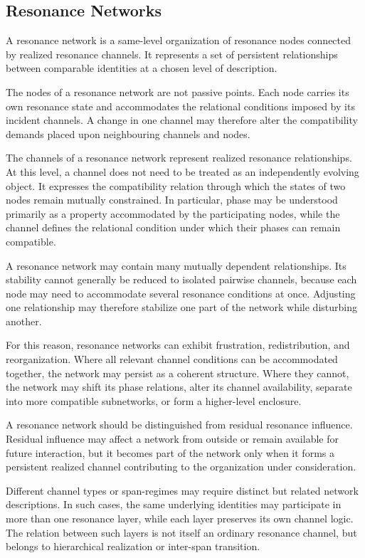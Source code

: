 \documentclass[11pt,a4paper]{article}
\begin{document}
\subsection{Resonance Networks}

A resonance network is a same-level organization of resonance nodes connected by realized resonance channels. It represents a set of persistent relationships between comparable identities at a chosen level of description.

The nodes of a resonance network are not passive points. Each node carries its own resonance state and accommodates the relational conditions imposed by its incident channels. A change in one channel may therefore alter the compatibility demands placed upon neighbouring channels and nodes.

The channels of a resonance network represent realized resonance relationships. At this level, a channel does not need to be treated as an independently evolving object. It expresses the compatibility relation through which the states of two nodes remain mutually constrained. In particular, phase may be understood primarily as a property accommodated by the participating nodes, while the channel defines the relational condition under which their phases can remain compatible.

A resonance network may contain many mutually dependent relationships. Its stability cannot generally be reduced to isolated pairwise channels, because each node may need to accommodate several resonance conditions at once. Adjusting one relationship may therefore stabilize one part of the network while disturbing another.

For this reason, resonance networks can exhibit frustration, redistribution, and reorganization. Where all relevant channel conditions can be accommodated together, the network may persist as a coherent structure. Where they cannot, the network may shift its phase relations, alter its channel availability, separate into more compatible subnetworks, or form a higher-level enclosure.

A resonance network should be distinguished from residual resonance influence. Residual influence may affect a network from outside or remain available for future interaction, but it becomes part of the network only when it forms a persistent realized channel contributing to the organization under consideration.

Different channel types or span-regimes may require distinct but related network descriptions. In such cases, the same underlying identities may participate in more than one resonance layer, while each layer preserves its own channel logic. The relation between such layers is not itself an ordinary resonance channel, but belongs to hierarchical realization or inter-span transition.
\end{document}
